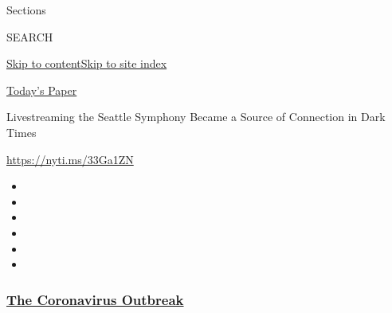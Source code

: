 Sections

SEARCH

\protect\hyperlink{site-content}{Skip to
content}\protect\hyperlink{site-index}{Skip to site index}

\href{https://myaccount.nytimes3xbfgragh.onion/auth/login?response_type=cookie\&client_id=vi}{}

\href{https://www.nytimes3xbfgragh.onion/section/todayspaper}{Today's
Paper}

Livestreaming the Seattle Symphony Became a Source of Connection in Dark
Times

\url{https://nyti.ms/33Ga1ZN}

\begin{itemize}
\item
\item
\item
\item
\item
\item
\end{itemize}

\hypertarget{the-coronavirus-outbreak}{%
\subsubsection{\texorpdfstring{\href{https://www.nytimes3xbfgragh.onion/news-event/coronavirus?name=styln-coronavirus-national\&region=TOP_BANNER\&block=storyline_menu_recirc\&action=click\&pgtype=Article\&impression_id=f2d49420-f52e-11ea-b9b1-3dadc7cfc0e9\&variant=undefined}{The
Coronavirus
Outbreak}}{The Coronavirus Outbreak}}\label{the-coronavirus-outbreak}}

